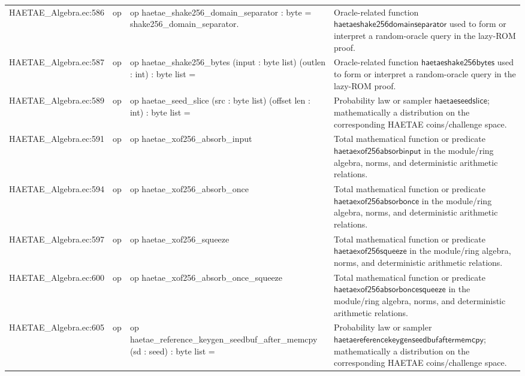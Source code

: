 \documentclass[10pt]{article}
\begin{document}
\begin{longtable}{L{0.11\textwidth}L{0.055\textwidth}L{0.385\textwidth}L{0.41\textwidth}}
HAETAE\_\allowbreak{}Algebra.\allowbreak{}ec:\allowbreak{}586 & op & {\ttfamily\scriptsize op haetae\_\allowbreak{}shake256\_\allowbreak{}domain\_\allowbreak{}separator : byte = shake256\_\allowbreak{}domain\_\allowbreak{}separator.} & Oracle-related function $\mathsf{haetaeshake256domainseparator}$ used to form or interpret a random-oracle query in the lazy-ROM proof. \\
HAETAE\_\allowbreak{}Algebra.\allowbreak{}ec:\allowbreak{}587 & op & {\ttfamily\scriptsize op haetae\_\allowbreak{}shake256\_\allowbreak{}bytes (input : byte list) (outlen : int) : byte list =} & Oracle-related function $\mathsf{haetaeshake256bytes}$ used to form or interpret a random-oracle query in the lazy-ROM proof. \\
HAETAE\_\allowbreak{}Algebra.\allowbreak{}ec:\allowbreak{}589 & op & {\ttfamily\scriptsize op haetae\_\allowbreak{}seed\_\allowbreak{}slice (src : byte list) (offset len : int) : byte list =} & Probability law or sampler $\mathsf{haetaeseedslice}$; mathematically a distribution on the corresponding HAETAE coins/challenge space. \\
HAETAE\_\allowbreak{}Algebra.\allowbreak{}ec:\allowbreak{}591 & op & {\ttfamily\scriptsize op haetae\_\allowbreak{}xof256\_\allowbreak{}absorb\_\allowbreak{}input} & Total mathematical function or predicate $\mathsf{haetaexof256absorbinput}$ in the module/ring algebra, norms, and deterministic arithmetic relations. \\
HAETAE\_\allowbreak{}Algebra.\allowbreak{}ec:\allowbreak{}594 & op & {\ttfamily\scriptsize op haetae\_\allowbreak{}xof256\_\allowbreak{}absorb\_\allowbreak{}once} & Total mathematical function or predicate $\mathsf{haetaexof256absorbonce}$ in the module/ring algebra, norms, and deterministic arithmetic relations. \\
HAETAE\_\allowbreak{}Algebra.\allowbreak{}ec:\allowbreak{}597 & op & {\ttfamily\scriptsize op haetae\_\allowbreak{}xof256\_\allowbreak{}squeeze} & Total mathematical function or predicate $\mathsf{haetaexof256squeeze}$ in the module/ring algebra, norms, and deterministic arithmetic relations. \\
HAETAE\_\allowbreak{}Algebra.\allowbreak{}ec:\allowbreak{}600 & op & {\ttfamily\scriptsize op haetae\_\allowbreak{}xof256\_\allowbreak{}absorb\_\allowbreak{}once\_\allowbreak{}squeeze} & Total mathematical function or predicate $\mathsf{haetaexof256absorboncesqueeze}$ in the module/ring algebra, norms, and deterministic arithmetic relations. \\
HAETAE\_\allowbreak{}Algebra.\allowbreak{}ec:\allowbreak{}605 & op & {\ttfamily\scriptsize op haetae\_\allowbreak{}reference\_\allowbreak{}keygen\_\allowbreak{}seedbuf\_\allowbreak{}after\_\allowbreak{}memcpy (sd : seed) : byte list =} & Probability law or sampler $\mathsf{haetaereferencekeygenseedbufaftermemcpy}$; mathematically a distribution on the corresponding HAETAE coins/challenge space. \\

\end{longtable}
\end{document}
